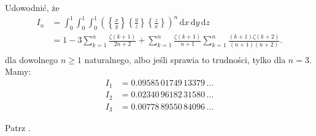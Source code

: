 %

\begin{problem_with_solution}
    \label{valean_1_48}%
    Udowodnić, że 
    \begin{align}
        I_n & = \int_0^1 \int_0^1 \int_0^1 \left( \left\{\frac x y \right\} \left\{\frac yz\right\} \left\{\frac zx \right\} \right)^n \,\mathrm{d}x\,\mathrm{d}y\,\mathrm{d}z \\
        & = 1 - 3 \sum_{k=1}^n \frac{\zeta(k+1)}{2n+2}  + \sum_{k=1}^n \frac{\zeta(k+1)}{n+1} \sum_{k=1}^n \frac{(k+1) \zeta(k+2)}{(n+1)(n+2)} . \\
    \end{align} 
    dla dowolnego $n \ge 1$ naturalnego, albo jeśli sprawia to trudności, tylko dla $n = 3$.
    Mamy:
    \begin{align}
        I_1 & = 0.09585\,01749\,13379\,\ldots \\
        I_2 & = 0.02340\,96182\,31580\,\ldots \\
        I_3 & = 0.00778\,89550\,84096\,\ldots %
    \end{align}
\end{problem_with_solution}

\begin{solution}
    Patrz \cite[s. ?????]{valean19}.
\end{solution}

%